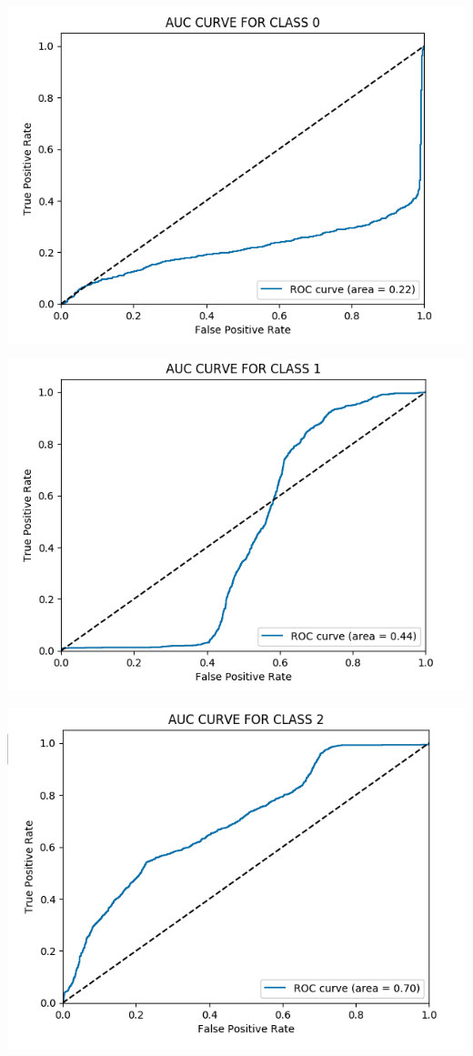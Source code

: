 \documentclass[12pt]{article}
\begin{document}
\begin{multicols*}{2}
\begin{center}
	\includegraphics[scale=0.3]{../screenshot/Overlapping/roc_0.png}

	\includegraphics[scale=0.3]{../screenshot/Overlapping/roc_1.png}

	\includegraphics[scale=0.3]{../screenshot/Overlapping/roc_2.png}
  \end{center}
  

\end{multicols*}
\end{document}
